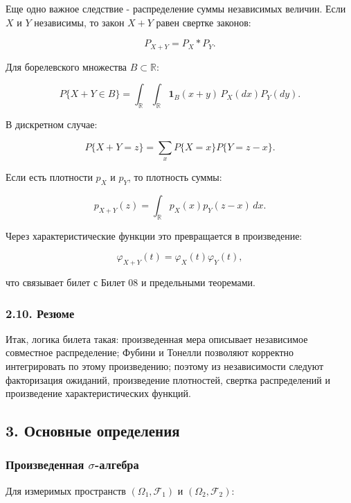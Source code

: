 \documentclass[
  11pt,
  a4paper,
]{article}
\begin{document}
Еще одно важное следствие - распределение суммы независимых величин.
Если \(X\) и \(Y\) независимы, то закон \(X+Y\) равен свертке законов:

\[
P_{X+Y}=P_X*P_Y.
\]

Для борелевского множества \(B\subset\mathbb R\):

\[
P\{X+Y\in B\}
=
\int_{\mathbb R}\int_{\mathbb R}\mathbf 1_B(x+y)\,P_X(dx)P_Y(dy).
\]

В дискретном случае:

\[
P\{X+Y=z\}
=
\sum_x P\{X=x\}P\{Y=z-x\}.
\]

Если есть плотности \(p_X\) и \(p_Y\), то плотность суммы:

\[
p_{X+Y}(z)
=
\int_{\mathbb R}p_X(x)p_Y(z-x)\,dx.
\]

Через характеристические функции это превращается в произведение:

\[
\varphi_{X+Y}(t)=\varphi_X(t)\varphi_Y(t),
\]

что связывает билет с Билет 08 и предельными теоремами.

\subsubsection{2.10. Резюме}\label{ux440ux435ux437ux44eux43cux435}

Итак, логика билета такая: произведенная мера описывает независимое
совместное распределение; Фубини и Тонелли позволяют корректно
интегрировать по этому произведению; поэтому из независимости следуют
факторизация ожиданий, произведение плотностей, свертка распределений и
произведение характеристических функций.

\subsection{3. Основные
определения}\label{ux43eux441ux43dux43eux432ux43dux44bux435-ux43eux43fux440ux435ux434ux435ux43bux435ux43dux438ux44f}

\subsubsection{\texorpdfstring{Произведенная
\(\sigma\)-алгебра}{Произведенная \textbackslash sigma-алгебра}}\label{ux43fux440ux43eux438ux437ux432ux435ux434ux435ux43dux43dux430ux44f-sigma-ux430ux43bux433ux435ux431ux440ux430}

Для измеримых пространств \((\Omega_1,\mathcal F_1)\) и
\((\Omega_2,\mathcal F_2)\):
\end{document}
